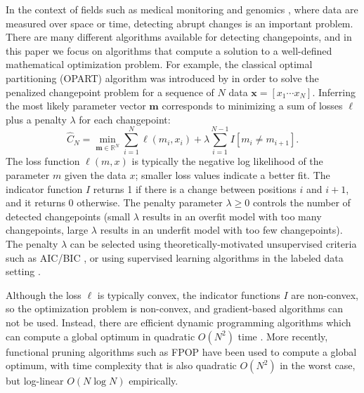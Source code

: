 \documentclass[12pt]{article}
\begin{document}
In the context of fields such as medical monitoring \citep{Fotoohinasab2020} and genomics \citep{HOCKING-penalties}, where data are measured over space or time, detecting abrupt changes is an important problem.
There are many different algorithms available for detecting changepoints, and in this paper we focus on algorithms that compute a solution to a well-defined mathematical optimization problem. 
For example, the classical optimal partitioning (OPART) algorithm was introduced by \citet{Jackson2005} in order to solve the penalized changepoint problem for a sequence of $N$ data $\mathbf x = [ x_1 \cdots x_N ]$. 
Inferring the most likely parameter vector $\mathbf m$ corresponds to minimizing a sum of losses $\ell$ plus a penalty $\lambda$ for each changepoint:
\begin{equation}
    \label{eq:op}
    \hat C_N = \min_{\mathbf m\in \mathbb R^N}
    \sum_{i=1}^N \ell(m_i, x_i) + 
    \lambda \sum_{i=1}^{N-1} I[m_i \neq m_{i+1}].
\end{equation}
The loss function $\ell(m, x)$ is typically the negative log likelihood of the parameter $m$ given the data $x$; smaller loss values indicate a better fit. 
The indicator function $I$ returns 1 if there is a change between positions $i$ and $i+1$, and it returns 0 otherwise. 
The penalty parameter $\lambda\geq 0$ controls the number of detected changepoints 
(small $\lambda$ results in an overfit model with too many changepoints, large $\lambda$ results in an underfit model with too few changepoints).
The penalty $\lambda$ can be selected using theoretically-motivated unsupervised criteria such as AIC/BIC \citep{Akaike73, Schwarz78, Yao88, mBIC}, or using supervised learning algorithms in the labeled data setting \citep{HOCKING-penalties}.

Although the loss $\ell$ is typically convex, the indicator functions $I$ are non-convex, so the optimization problem is non-convex, and gradient-based algorithms can not be used. 
Instead, there are efficient dynamic programming algorithms which can compute a global optimum in quadratic $O(N^2)$ time \citep{segment-neighborhood,Jackson2005}. 
More recently, functional pruning algorithms such as FPOP \citep{Maidstone2016} have been used to compute a global optimum, with time complexity that is also quadratic $O(N^2)$ in the worst case, but log-linear $O(N\log N)$ empirically. 
\end{document}
